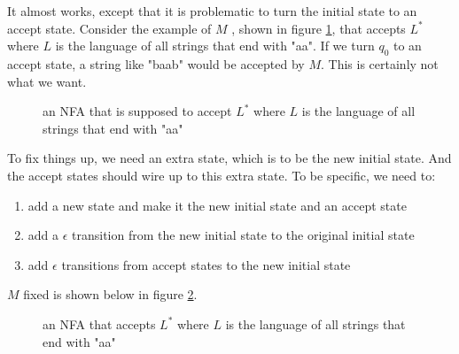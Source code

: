\documentclass[11pt]{article}
\begin{document}
It almost works, except that it is problematic to turn the initial state to an
accept state. Consider the example of $M$ , shown in figure \ref{fig:fig9},
that accepts $L^\ast$ where $L$ is the language of all strings that end with
"aa". If we turn $q_0$ to an accept state, a string like "baab" would be
accepted by $M$. This is certainly not what we want.

\begin{figure}[ht]
    \centering
    \caption{an NFA that is supposed to accept $L^\ast$ where $L$ is the language
    of all strings that end with "aa"}
    \label{fig:fig9}
\end{figure}

To fix things up, we need an extra state, which is to be the new initial state.
And the accept states should wire up to this extra state. To be specific, we
need to:
\begin{enumerate}
\item add a new state and make it the new initial state and an accept state
\item add a $\epsilon$ transition from the new initial state to the original
initial state
\item add $\epsilon$ transitions from accept states to the new initial state
\end{enumerate}

$M$ fixed is shown below in figure \ref{fig:fig10}.

\begin{figure}[ht]
    \centering
    \caption{an NFA that accepts $L^\ast$ where $L$ is the language of all
    strings that end with "aa"}
    \label{fig:fig10}
\end{figure}
\end{document}
